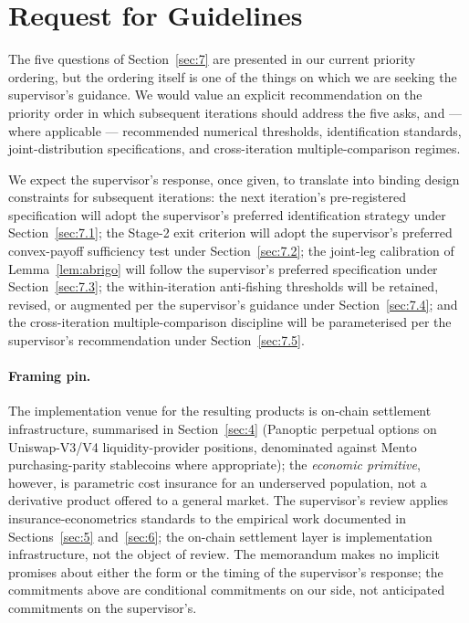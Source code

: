 \section{Request for Guidelines}\label{sec:8}

The five questions of Section~\ref{sec:7} are presented in our current
priority ordering, but the ordering itself is one of the things on which we
are seeking the supervisor's guidance. We would value an explicit
recommendation on the priority order in which subsequent iterations should
address the five asks, and --- where applicable --- recommended numerical
thresholds, identification standards, joint-distribution specifications,
and cross-iteration multiple-comparison regimes.

We expect the supervisor's response, once given, to translate into binding
design constraints for subsequent iterations: the next iteration's
pre-registered specification will adopt the supervisor's preferred
identification strategy under Section~\ref{sec:7.1}; the Stage-2 exit
criterion will adopt the supervisor's preferred convex-payoff sufficiency
test under Section~\ref{sec:7.2}; the joint-leg calibration of
Lemma~\ref{lem:abrigo} will follow the supervisor's preferred
specification under Section~\ref{sec:7.3}; the within-iteration
anti-fishing thresholds will be retained, revised, or augmented per
the supervisor's guidance under Section~\ref{sec:7.4}; and the
cross-iteration multiple-comparison discipline will be parameterised per
the supervisor's recommendation under Section~\ref{sec:7.5}.

\paragraph{Framing pin.} The implementation venue for the resulting
products is on-chain settlement infrastructure, summarised in
Section~\ref{sec:4} (Panoptic perpetual options on Uniswap-V3/V4
liquidity-provider positions, denominated against Mento purchasing-parity
stablecoins where appropriate); the \emph{economic primitive}, however,
is parametric cost insurance for an underserved population, not a
derivative product offered to a general market. The supervisor's review
applies insurance-econometrics standards
\citep{carter_etal_2017,mahul_stutley_2010,clarke_2016} to the empirical
work documented in Sections~\ref{sec:5} and~\ref{sec:6}; the on-chain
settlement layer is implementation infrastructure, not the object of
review. The memorandum makes no implicit promises about either the form
or the timing of the supervisor's response; the commitments above are
conditional commitments on our side, not anticipated commitments on the
supervisor's.
